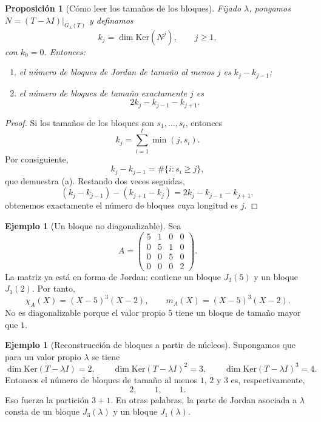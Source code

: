 \documentclass[10pt,a4paper,oneside]{article}
\theoremstyle{plain}
\newtheorem{proposition}[theorem]{Proposición}
\theoremstyle{definition}
\newtheorem{example}[theorem]{Ejemplo}
\theoremstyle{remark}
\newcommand{\Ker}{\mathrm{Ker}}
\begin{document}
\begin{proposition}[Cómo leer los tamaños de los bloques]
Fijado \(\lambda\), pongamos \(N=(T-\lambda I)|_{G_\lambda(T)}\) y definamos
\[
k_j=\dim\Ker(N^j),\qquad j\ge1,
\]
con \(k_0=0\). Entonces:
\begin{enumerate}[label=\textup{(\alph*)}]
\item el número de bloques de Jordan de tamaño al menos \(j\) es \(k_j-k_{j-1}\);
\item el número de bloques de tamaño exactamente \(j\) es
\[
2k_j-k_{j-1}-k_{j+1}.
\]
\end{enumerate}
\end{proposition}

\begin{proof}
Si los tamaños de los bloques son \(s_1,\dots,s_t\), entonces
\[
k_j=\sum_{i=1}^t \min(j,s_i).
\]
Por consiguiente,
\[
k_j-k_{j-1}=\#\{i: s_i\ge j\},
\]
que demuestra \textup{(a)}. Restando dos veces seguidas,
\[
(k_j-k_{j-1})-(k_{j+1}-k_j)=2k_j-k_{j-1}-k_{j+1},
\]
obtenemos exactamente el número de bloques cuya longitud es \(j\).
\end{proof}

\begin{example}[Un bloque no diagonalizable]
Sea
\[
A=
\begin{pmatrix}
5&1&0&0\\
0&5&1&0\\
0&0&5&0\\
0&0&0&2
\end{pmatrix}.
\]
La matriz ya está en forma de Jordan: contiene un bloque \(J_3(5)\) y un bloque \(J_1(2)\). Por tanto,
\[
\chi_A(X)=(X-5)^3(X-2),
\qquad
m_A(X)=(X-5)^3(X-2).
\]
No es diagonalizable porque el valor propio \(5\) tiene un bloque de tamaño mayor que \(1\).
\end{example}

\begin{example}[Reconstrucción de bloques a partir de núcleos]
Supongamos que para un valor propio \(\lambda\) se tiene
\[
\dim\Ker(T-\lambda I)=2,
\qquad
\dim\Ker(T-\lambda I)^2=3,
\qquad
\dim\Ker(T-\lambda I)^3=4.
\]
Entonces el número de bloques de tamaño al menos \(1\), \(2\) y \(3\) es, respectivamente,
\[
2,
\qquad
1,
\qquad
1.
\]
Eso fuerza la partición \(3+1\). En otras palabras, la parte de Jordan asociada a \(\lambda\) consta de un bloque \(J_3(\lambda)\) y un bloque \(J_1(\lambda)\).
\end{example}
\end{document}

